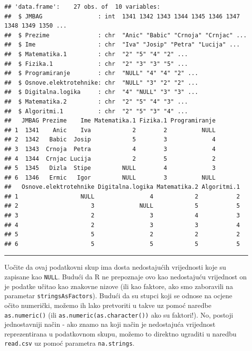 \documentclass[]{book}
\theoremstyle{definition}
\theoremstyle{definition}
\theoremstyle{definition}
\theoremstyle{remark}
\begin{document}
\begin{verbatim}
## 'data.frame':    27 obs. of  10 variables:
##  $ JMBAG                : int  1341 1342 1343 1344 1345 1346 1347 1348 1349 1350 ...
##  $ Prezime              : chr  "Anic" "Babic" "Crnoja" "Crnjac" ...
##  $ Ime                  : chr  "Iva" "Josip" "Petra" "Lucija" ...
##  $ Matematika.1         : chr  "2" "5" "4" "2" ...
##  $ Fizika.1             : chr  "2" "3" "3" "5" ...
##  $ Programiranje        : chr  "NULL" "4" "4" "2" ...
##  $ Osnove.elektrotehnike: chr  "NULL" "3" "2" "2" ...
##  $ Digitalna.logika     : chr  "4" "NULL" "3" "3" ...
##  $ Matematika.2         : chr  "2" "5" "4" "3" ...
##  $ Algoritmi.1          : chr  "2" "5" "3" "4" ...
##   JMBAG Prezime    Ime Matematika.1 Fizika.1 Programiranje
## 1  1341    Anic    Iva            2        2          NULL
## 2  1342   Babic  Josip            5        3             4
## 3  1343  Crnoja  Petra            4        3             4
## 4  1344  Crnjac Lucija            2        5             2
## 5  1345   Dizla  Stipe         NULL        4             3
## 6  1346   Ermic   Igor         NULL        3          NULL
##   Osnove.elektrotehnike Digitalna.logika Matematika.2 Algoritmi.1
## 1                  NULL                4            2           2
## 2                     3             NULL            5           5
## 3                     2                3            4           3
## 4                     2                3            3           4
## 5                     5                2            2           2
## 6                     5                5            5           5
\end{verbatim}

\begin{center}\rule{0.5\linewidth}{\linethickness}\end{center}

Uočite da ovaj podatkovni skup ima dosta nedostajućih vrijednosti koje
su zapisane kao \texttt{NULL}. Budući da R ne prepoznaje ovo kao
nedostajuću vrijednost on je podatke učitao kao znakovne nizove (ili kao
faktore, ako smo zaboravili na parametar \texttt{stringsAsFactors}).
Budući da su stupci koji se odnose na ocjene očito numerički, možemo ih
lako pretvoriti u takve uz pomoć naredbe \texttt{as.numeric()} (ili
\texttt{as.numeric(as.character())} ako su faktori!). No, postoji
jednostavniji način - ako znamo na koji način je nedostajuća vrijednost
reprezentirana u podatkovnom skupu, možemo to direktno ugraditi u
naredbu \texttt{read.csv} uz pomoć parametra \texttt{na.strings}.
\end{document}
